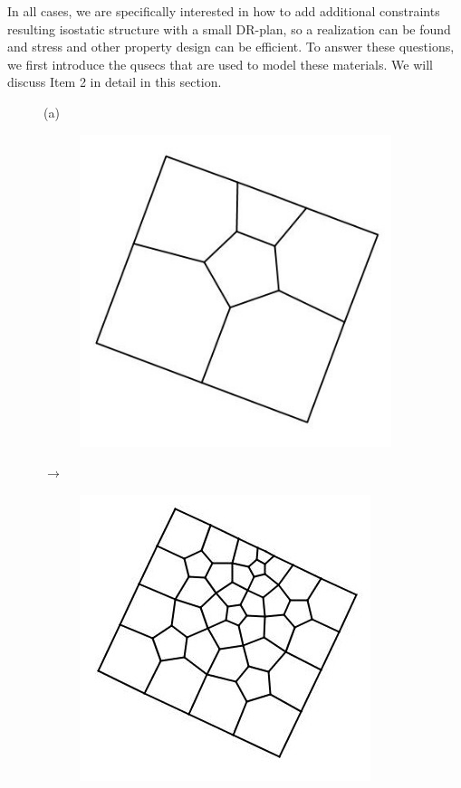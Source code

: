 In all cases,
we are specifically interested in how to add additional constraints
resulting isostatic structure with a small DR-plan, so a realization can be
found and stress and other property design can be efficient.
To answer these questions, we first introduce the
qusecs that are used to model these materials.
We will discuss Item 2 in detail in this section.

\begin{figure}\centering
    (a)
    \begin{subfigure}{0.2\linewidth}
        \includegraphics[width=\linewidth]{img/pentl1}
    \end{subfigure}
    $\rightarrow$
    \begin{subfigure}{0.2\linewidth}
        \includegraphics[width=\linewidth]{img/pentl2}
    \end{subfigure}


\end{figure}
